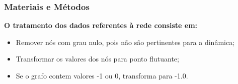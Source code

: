 \begin{frame}
  \frametitle{Materiais e Métodos}

  \textbf{O tratamento dos dados referentes à rede consiste em:}

  \begin{alertblock}{}
    \vspace{5mm}

    \begin{itemize}
      \item Remover nós com grau nulo, pois não são pertinentes para a dinâmica;
      \vspace{5mm}

      \item Transformar os valores dos nós para ponto flutuante;
      \vspace{5mm}

      \item Se o grafo contem valores -1 ou 0, transforma para -1.0.
      \vspace{5mm}

    \end{itemize}
  \end{alertblock}
\end{frame}
